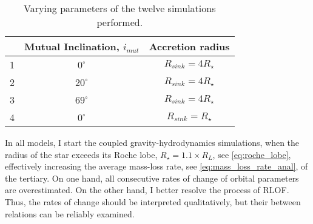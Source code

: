 
\begin{table}[H]
    \centering
    \begin{tabular}{| c | c | c |}
     \hline
     &Mutual Inclination, $i_{mut}$ & Accretion radius \\
    \hline
     1&$0^{\circ}$ & $R_{sink} = 4R_{\star}$\\
     2&$20^{\circ}$ & $R_{sink} = 4R_{\star}$ \\
     3&$69^{\circ}$ & $R_{sink} = 4R_{\star}$ \\
     \hline
     4&$0^{\circ}$ & $R_{sink} = R_{\star}$ \\
     \hline
    \end{tabular}
    \caption{ Varying parameters of the twelve simulations performed.}
\label{tab:simulations_settings}
\end{table}
In all models, I start the coupled gravity-hydrodynamics simulations, when the radius of the star exceeds its Roche lobe, $R_{\star} = 1.1 \times R_L$, see \cref{eq:roche_lobe}, effectively increasing the average mass-loss rate, see \cref{eq:mass_loss_rate_anal}, of the tertiary. On one hand,  all consecutive rates of change of orbital parameters are overestimated. On the other hand, I better resolve the process of RLOF. Thus, the rates of change should be interpreted qualitatively, but their between relations can be reliably examined.

